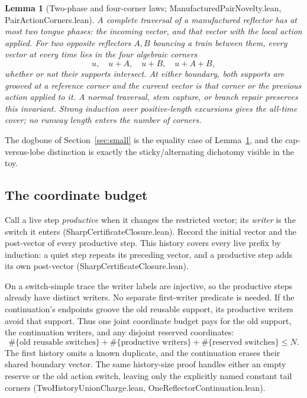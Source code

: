\documentclass[11pt]{article}
\newtheorem{lemma}[theorem]{Lemma}
\theoremstyle{definition}
\newcommand{\file}[1]{\textsf{#1}}
\begin{document}
\begin{lemma}[Two-phase and four-corner laws;
  \file{ManufacturedPairNovelty.lean}, \file{PairActionCorners.lean}]
  \label{lem:phases}
  A complete traversal of a manufactured reflector has at most two tongue
  phases: the incoming vector, and that vector with the local action
  applied.  For \emph{two} opposite reflectors $A, B$ bouncing a train
  between them, every vector at every time lies in the four algebraic
  corners
  \[ u,\quad u + A,\quad u + B,\quad u + A + B, \]
  whether or not their supports intersect. At either boundary, both
  supports are grooved at a reference corner and the current vector is
  that corner or the previous action applied to it. A normal traversal,
  stem capture, or branch repair preserves this invariant. Strong induction
  over positive-length excursions gives the all-time cover; no runway
  length enters the number of corners.
\end{lemma}

The dogbone of Section~\ref{sec:small} is the equality case of
Lemma~\ref{lem:phases}, and the cap-versus-lobe distinction is exactly
the sticky/alternating dichotomy visible in the toy.

\subsection{The coordinate budget}\label{ssec:budget}

Call a live step \emph{productive} when it changes the restricted vector;
its \emph{writer} is the switch it enters
(\file{SharpCertificateClosure.lean}). Record the initial vector and the
post-vector of every productive step. This history covers every live prefix
by induction: a quiet step repeats its preceding vector, and a productive
step adds its own post-vector (\file{SharpCertificateClosure.lean}).

On a switch-simple trace the writer labels are injective, so the productive
steps already have distinct writers. No separate first-writer predicate is
needed. If the continuation's endpoints groove the old reusable support,
its productive writers avoid that support. Thus one joint coordinate budget
pays for the old support, the continuation writers, and any disjoint reserved
coordinates:
\[
  \#\{\text{old reusable switches}\}+
  \#\{\text{productive writers}\}+
  \#\{\text{reserved switches}\}\le N.
\]
The first history omits a known duplicate, and the continuation erases their
shared boundary vector. The same history-size proof handles either an empty
reserve or the old action switch, leaving only the explicitly named constant
tail corners (\file{TwoHistoryUnionCharge.lean},
\file{OneReflectorContinuation.lean}).
\end{document}
